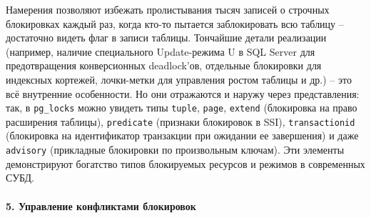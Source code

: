  Намерения позволяют избежать пролистывания тысяч записей о строчных блокировках каждый раз, когда кто-то пытается заблокировать всю таблицу – достаточно видеть флаг в записи таблицы. Тончайшие детали реализации (например, наличие специального Update-режима U в SQL Server для предотвращения конверсионных deadlock’ов, отдельные блокировки для индексных кортежей, лочки-метки для управления ростом таблицы и др.) – это всё внутренние особенности. Но они отражаются и наружу через представления: так, в \texttt{pg\_locks} можно увидеть типы \texttt{tuple}, \texttt{page}, \texttt{extend} (блокировка на право расширения таблицы), \texttt{predicate} (признаки блокировок в SSI), \texttt{transactionid} (блокировка на идентификатор транзакции при ожидании ее завершения) и даже \texttt{advisory} (прикладные блокировки по произвольным ключам). Эти элементы демонстрируют богатство типов блокируемых ресурсов и режимов в современных СУБД.

\paragraph{5. Управление конфликтами блокировок} ~\\

